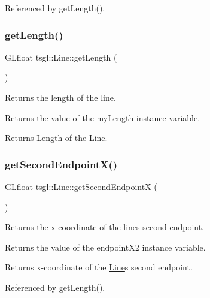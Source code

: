 Referenced by get\+Length().

\mbox{\label{classtsgl_1_1_line_a0deafda4900d21401ab22af6c4a1d2a0}} 
\subsubsection{\texorpdfstring{get\+Length()}{getLength()}}
{\footnotesize\ttfamily G\+Lfloat tsgl\+::\+Line\+::get\+Length (\begin{DoxyParamCaption}{ }\end{DoxyParamCaption})\hspace{0.3cm}{\ttfamily [inline]}}



Returns the length of the line. 

Returns the value of the my\+Length instance variable. \begin{DoxyReturn}{Returns}
Length of the \hyperlink{classtsgl_1_1_line}{Line}. 
\end{DoxyReturn}
\mbox{\label{classtsgl_1_1_line_a1c187707ad666a370bdaecfbbec1cace}} 
\subsubsection{\texorpdfstring{get\+Second\+Endpoint\+X()}{getSecondEndpointX()}}
{\footnotesize\ttfamily G\+Lfloat tsgl\+::\+Line\+::get\+Second\+EndpointX (\begin{DoxyParamCaption}{ }\end{DoxyParamCaption})}



Returns the x-\/coordinate of the line\textquotesingle{}s second endpoint. 

Returns the value of the endpoint\+X2 instance variable. \begin{DoxyReturn}{Returns}
x-\/coordinate of the \hyperlink{classtsgl_1_1_line}{Line}\textquotesingle{}s second endpoint. 
\end{DoxyReturn}


Referenced by get\+Length().

\mbox{\label{classtsgl_1_1_line_acc0a127826c5d6a5bd763d8116c97578}} 
